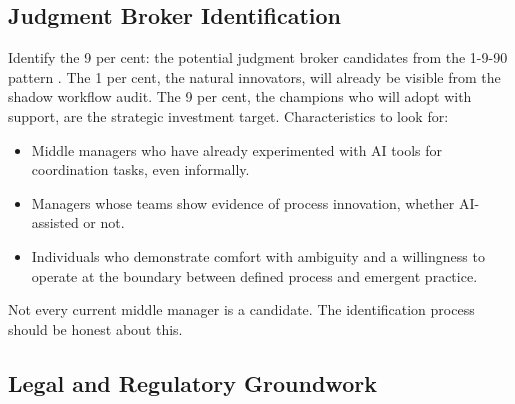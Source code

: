\subsection{Judgment Broker Identification}

Identify the 9 per cent: the potential judgment broker candidates from the 1-9-90 pattern \parencite{BCGAgenticShift2025}. The 1 per cent, the natural innovators, will already be visible from the shadow workflow audit. The 9 per cent, the champions who will adopt with support, are the strategic investment target. Characteristics to look for:

\begin{itemize}
  \item Middle managers who have already experimented with AI tools for coordination tasks, even informally.
  \item Managers whose teams show evidence of process innovation, whether AI-assisted or not.
  \item Individuals who demonstrate comfort with ambiguity and a willingness to operate at the boundary between defined process and emergent practice.
\end{itemize}

Not every current middle manager is a candidate. The identification process should be honest about this.

\subsection{Legal and Regulatory Groundwork}
\label{sec:legal-groundwork}

